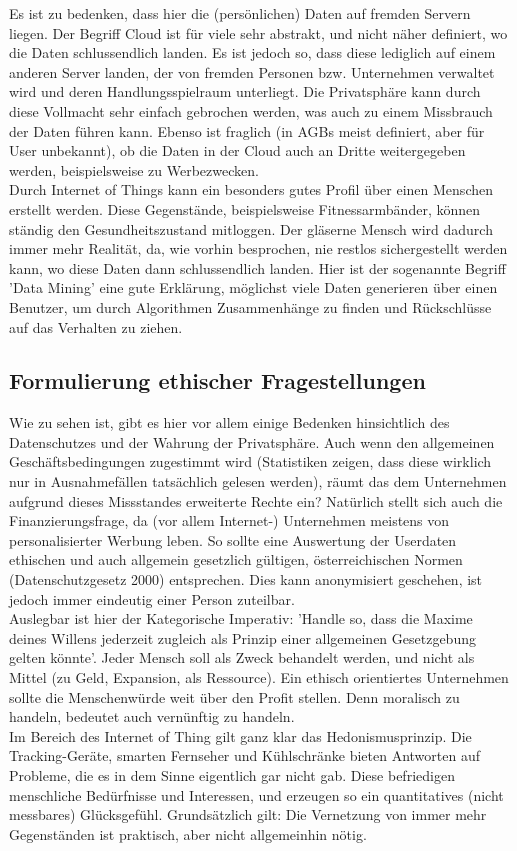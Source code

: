 \documentclass[letterpaper, 12pt]{article}
\let\tempsubsection\subsection
\renewcommand\subsection[1]{\vspace{0cm}\tempsubsection{#1}\vspace{0cm}}
\begin{document}
Es ist zu bedenken, dass hier die (persönlichen) Daten auf fremden Servern liegen. Der Begriff Cloud ist für viele sehr abstrakt, und nicht näher definiert, wo die Daten schlussendlich landen. Es ist jedoch so, dass diese lediglich auf einem anderen Server landen, der von fremden Personen bzw. Unternehmen verwaltet wird und deren Handlungsspielraum unterliegt. Die Privatsphäre kann durch diese Vollmacht sehr einfach gebrochen werden, was auch zu einem Missbrauch der Daten führen kann. Ebenso ist fraglich (in AGBs meist definiert, aber für User unbekannt), ob die Daten in der Cloud auch an Dritte weitergegeben werden, beispielsweise zu Werbezwecken. \\
Durch Internet of Things kann ein besonders gutes Profil über einen Menschen erstellt werden. Diese Gegenstände, beispielsweise Fitnessarmbänder, können ständig den Gesundheitszustand mitloggen. Der gläserne Mensch wird dadurch immer mehr Realität, da, wie vorhin besprochen, nie restlos sichergestellt werden kann, wo diese Daten dann schlussendlich landen. Hier ist der sogenannte Begriff 'Data Mining' eine gute Erklärung, möglichst viele Daten generieren über einen Benutzer, um durch Algorithmen Zusammenhänge zu finden und Rückschlüsse auf das Verhalten zu ziehen.

\subsection{Formulierung ethischer Fragestellungen}

Wie zu sehen ist, gibt es hier vor allem einige Bedenken hinsichtlich des Datenschutzes und der Wahrung der Privatsphäre. Auch wenn den allgemeinen Geschäftsbedingungen zugestimmt wird (Statistiken zeigen, dass diese wirklich nur in Ausnahmefällen tatsächlich gelesen werden), räumt das dem Unternehmen aufgrund dieses Missstandes erweiterte Rechte ein? Natürlich stellt sich auch die Finanzierungsfrage, da (vor allem Internet-) Unternehmen meistens von personalisierter Werbung leben. So sollte eine Auswertung der Userdaten ethischen und auch allgemein gesetzlich gültigen, österreichischen Normen (Datenschutzgesetz 2000) entsprechen. Dies kann anonymisiert geschehen, ist jedoch immer eindeutig einer Person zuteilbar. \\ Auslegbar ist hier der Kategorische Imperativ: 'Handle so, dass die Maxime deines Willens jederzeit zugleich als Prinzip einer allgemeinen Gesetzgebung gelten könnte'. Jeder Mensch soll als Zweck behandelt werden, und nicht als Mittel (zu Geld, Expansion, als Ressource). Ein ethisch orientiertes Unternehmen sollte die Menschenwürde weit über den Profit stellen. Denn moralisch zu handeln, bedeutet auch vernünftig zu handeln. \\
Im Bereich des Internet of Thing gilt ganz klar das Hedonismusprinzip. Die Tracking-Geräte, smarten Fernseher und Kühlschränke bieten Antworten auf Probleme, die es in dem Sinne eigentlich gar nicht gab. Diese befriedigen menschliche Bedürfnisse und Interessen, und erzeugen so ein quantitatives (nicht messbares) Glücksgefühl. Grundsätzlich gilt: Die Vernetzung von immer mehr Gegenständen ist praktisch, aber nicht allgemeinhin nötig. \cite{dsg}
\end{document}
